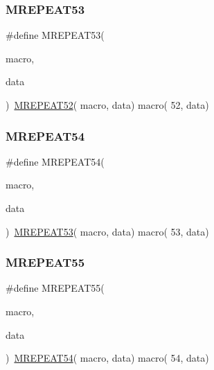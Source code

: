\mbox{\label{group__group__sam0__utils__mrepeat_ga89d961bc06d5e1e4f531ee43424c0e98}} 
\subsubsection{\texorpdfstring{MREPEAT53}{MREPEAT53}}
{\footnotesize\ttfamily \#define M\+R\+E\+P\+E\+A\+T53(\begin{DoxyParamCaption}\item[{}]{macro,  }\item[{}]{data }\end{DoxyParamCaption})~\mbox{\hyperlink{group__group__sam0__utils__mrepeat_ga321d36cd49e5f6ca5dc7066e7913e634}{M\+R\+E\+P\+E\+A\+T52}}( macro, data)   macro( 52, data)}

\mbox{\label{group__group__sam0__utils__mrepeat_ga04d38cb9d863bba593db5c5533234b2b}} 
\subsubsection{\texorpdfstring{MREPEAT54}{MREPEAT54}}
{\footnotesize\ttfamily \#define M\+R\+E\+P\+E\+A\+T54(\begin{DoxyParamCaption}\item[{}]{macro,  }\item[{}]{data }\end{DoxyParamCaption})~\mbox{\hyperlink{group__group__sam0__utils__mrepeat_ga89d961bc06d5e1e4f531ee43424c0e98}{M\+R\+E\+P\+E\+A\+T53}}( macro, data)   macro( 53, data)}

\mbox{\label{group__group__sam0__utils__mrepeat_ga43d357d7b292b560fb1a49f4778f56e8}} 
\subsubsection{\texorpdfstring{MREPEAT55}{MREPEAT55}}
{\footnotesize\ttfamily \#define M\+R\+E\+P\+E\+A\+T55(\begin{DoxyParamCaption}\item[{}]{macro,  }\item[{}]{data }\end{DoxyParamCaption})~\mbox{\hyperlink{group__group__sam0__utils__mrepeat_ga04d38cb9d863bba593db5c5533234b2b}{M\+R\+E\+P\+E\+A\+T54}}( macro, data)   macro( 54, data)}

